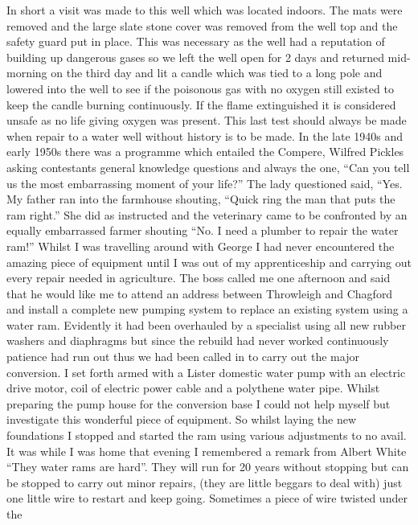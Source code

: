 
In short a visit was made to this well which was located indoors. The mats were
removed and the large slate stone cover was removed from the well top and the
safety guard put in place. This was necessary as the well had a reputation of
building up dangerous gases so we left the well open for 2 days and returned
mid-morning on the third day and lit a candle which was tied to a long pole and
lowered into the well to see if the poisonous gas with no oxygen still existed
to keep the candle burning continuously. If the flame extinguished it is
considered unsafe as no life giving oxygen was present. This last test should
always be made when repair to a water well without history is to be made. In
the late 1940s and early 1950s there was a programme which entailed the
Compere, Wilfred Pickles asking contestants general knowledge questions and
always the one, ``Can you tell us the most embarrassing moment of your life?''
The lady questioned said, ``Yes. My father ran into the farmhouse shouting,
``Quick ring the man that puts the ram right.'' She did as instructed and the
veterinary came to be confronted by an equally embarrassed farmer shouting
``No. I need a plumber to repair the water ram!'' Whilst I was travelling
around with George I had never encountered the amazing piece of equipment until
I was out of my apprenticeship and carrying out every repair needed in
agriculture. The boss called me one afternoon and said that he would like me
to attend an address between Throwleigh and Chagford and install a complete new
pumping system to replace an existing system using a water ram. Evidently it
had been overhauled by a specialist using all new rubber washers and diaphragms
but since the rebuild had never worked continuously patience had run out thus
we had been called in to carry out the major conversion. I set forth armed
with a Lister domestic water pump with an electric drive motor, coil of
electric power cable and a polythene water pipe. Whilst preparing the pump
house for the conversion base I could not help myself but investigate this
wonderful piece of equipment. So whilst laying the new foundations I stopped
and started the ram using various adjustments to no avail. It was while I was
home that evening I remembered a remark from Albert White ``They water rams are
hard''. They will run for 20 years without stopping but can be stopped to
carry out minor repairs, (they are little beggars to deal with) just one little
wire to restart and keep going. Sometimes a piece of wire twisted under the
